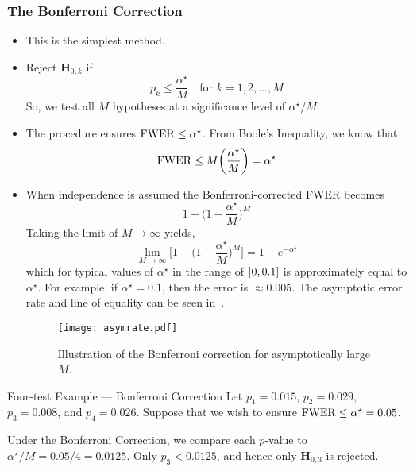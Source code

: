 \subsubsection*{The Bonferroni Correction}
\begin{itemize}
      \item This is the simplest method.
      \item Reject $ \mathbf{H}_{0,k} $ if
            \[ p_k\le \frac{\alpha^\star}{M} \quad\text{for }k=1,2,\ldots,M \]
            So, we test all $ M $ hypotheses at a significance level of $ \alpha^\star/M $.
      \item The procedure ensures $ \operatorname{FWER}\le \alpha^\star $. From Boole's Inequality,
            we know that
            \[ \operatorname{FWER}\le M\biggl(\frac{\alpha^\star}{M}\biggr)=\alpha^\star \]
      \item When independence is assumed the Bonferroni-corrected FWER becomes
            \[ 1-\biggl(1-\frac{\alpha^\star}{M} \biggr)^{\! M} \]
            Taking the limit of $ M \to\infty $ yields,
            \[ \lim\limits_{{M} \to {\infty}}\Biggl[1-\biggl(1-\frac{\alpha^\star}{M} \biggr)^{\! M}\Biggr]=1-e^{-\alpha^\star}  \]
            which for typical values of $ \alpha^\star $ in the range of $ \interval[open left]{0}{0.1} $ is approximately equal to $ \alpha^\star $.
            For example, if $ \alpha^\star=0.1 $, then the error is $ \approx 0.005 $. The asymptotic error rate
            and line of equality can be seen in~.
            \begin{figure}[!htbp]
                  \centering
                  \texttt{[image: asymrate.pdf]}
                  \caption{Illustration of the Bonferroni correction for asymptotically large $M$.}\label{fig:asymrate}
            \end{figure}
\end{itemize}
\begin{Example}{Four-test Example --- Bonferroni Correction}{}
      Let $ p_1=0.015 $, $ p_2=0.029 $, $ p_3=0.008 $, and $ p_4=0.026 $. Suppose that we wish to ensure
      $ \operatorname{FWER}\le \alpha^\star=0.05 $.

      \vspace{2mm}

      Under the Bonferroni Correction, we compare each
      $ p $-value to $ \alpha^\star/M=0.05/4=0.0125 $. Only $ p_3<0.0125 $, and hence
      only $ \mathbf{H}_{0,3} $ is rejected.
\end{Example}

